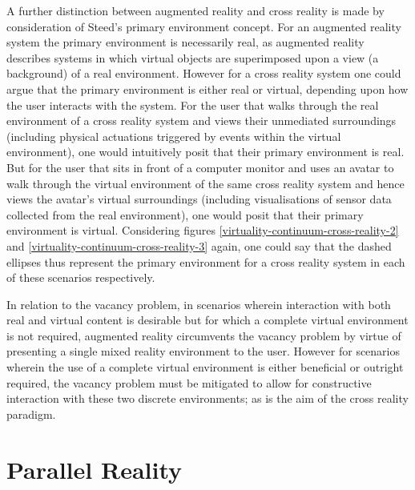A further distinction between augmented reality and cross reality is made by consideration of Steed's primary environment concept. For an augmented reality system the primary environment is necessarily real, as augmented reality describes systems in which virtual objects are superimposed upon a view (a background) of a real environment. However for a cross reality system one could argue that the primary environment is either real or virtual, depending upon how the user interacts with the system. For the user that walks through the real environment of a cross reality system and views their unmediated surroundings (including physical actuations triggered by events within the virtual environment), one would intuitively posit that their primary environment is real. But for the user that sits in front of a computer monitor and uses an avatar to walk through the virtual environment of the same cross reality system and hence views the avatar's virtual surroundings (including visualisations of sensor data collected from the real environment), one would posit that their primary environment is virtual. Considering figures \ref{virtuality-continuum-cross-reality-2} and \ref{virtuality-continuum-cross-reality-3} again, one could say that the dashed ellipses thus represent the primary environment for a cross reality system in each of these scenarios respectively.

In relation to the vacancy problem, in scenarios wherein interaction with both real and virtual content is desirable but for which a complete virtual environment is not required, augmented reality circumvents the vacancy problem by virtue of presenting a single mixed reality environment to the user. However for scenarios wherein the use of a complete virtual environment is either beneficial or outright required, the vacancy problem must be mitigated to allow for constructive interaction with these two discrete environments; as is the aim of the cross reality paradigm.


\section{Parallel Reality}
\label{parallelrealityinbackground}
\newcommand{\PRfootnote}{\footnote{Note that the use of `PR' in the quotation in section \ref{subsec_HyperReality} is a reference to `physical reality' (that author's term for what this thesis simply calls `reality') and is not a reference to parallel reality.}}

